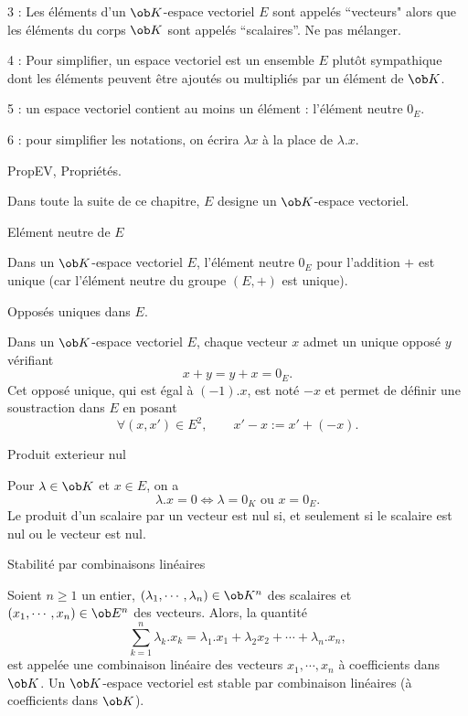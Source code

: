 \bigskip

\Remarque{} 3 : Les éléments d'un $\ob K$-espace vectoriel $E$ sont appelés ``vecteurs" alors que les éléments du corps $\ob K$ sont appelés ``scalaires''. Ne pas mélanger. 
\bigskip

\Remarque{} 4 : Pour simplifier, un espace vectoriel est un ensemble $E$ plutôt sympathique dont les éléments peuvent être ajoutés ou multipliés 
par un élément de $\ob K$. 
\bigskip

\Remarque{} 5 : un espace vectoriel contient au moins un élément : l'élément neutre $0_E$. 
\bigskip

\Remarque{} 6 : pour simplifier les notations, on écrira $\lambda x$ à la place de $\lambda.x$. 
\bigskip

\Subsection PropEV, Propriétés.
\bigskip

\noindent
Dans toute la suite de ce chapitre, $E$ designe un $\ob K$-espace vectoriel. 

\Concept [] Elément neutre de $E$

\noindent
Dans un $\ob K$-espace vectoriel $E$, l'élément neutre $0_E$ pour l'addition $+$ est unique (car l'élément neutre du groupe $(E,+)$ est unique). 

\Concept [] Opposés uniques dans $E$. 

\noindent
Dans un $\ob K$-espace vectoriel $E$, chaque vecteur $x$ admet un unique opposé $y$ vérifiant $$
x+y=y+x=0_E.
$$ 
Cet opposé unique, qui est égal à $(-1).x$, est noté $-x$ et permet de définir une soustraction dans $E$ en posant
$$
\forall (x,x')\in E^2, \qquad x'-x:=x'+(-x).
$$

\Concept [] Produit exterieur nul

\noindent
Pour $\lambda\in\ob K$ et $x\in E$, on a 
$$
{
\lambda.x=0\Longleftrightarrow \lambda=0_K\mbox{ ou }x=0_E}. 
$$
Le produit d'un scalaire par un vecteur est nul si, et seulement si le scalaire est nul ou le vecteur est nul. 
\bigskip

\Concept [] Stabilité par combinaisons linéaires

Soient $n\ge1$ un entier, $(\lambda_1,\cdots,\lambda_n)\in\ob K^n$ des scalaires et $(x_1,\cdots, x_n)\in\ob E^n$ des vecteurs. Alors, la quantité 
$$
{\sum_{k=1}^n\lambda_k.x_k=\lambda_1.x_1+\lambda_2x_2+\cdots+\lambda_n.x_n}, 
$$
est appelée une combinaison linéaire des vecteurs $x_1,\cdots,x_n$ à coefficients dans $\ob K$. 
\medskip
Un $\ob K$-espace vectoriel est stable par combinaison linéaires (à coefficients dans $\ob K$). 

